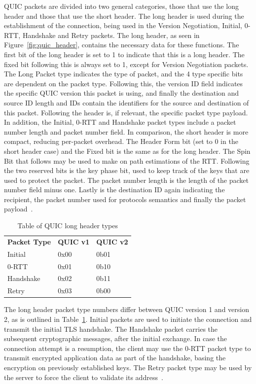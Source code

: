 \documentclass[english, 12pt, a4paper, elec, utf8, a-2b, online]{aaltothesis}
\begin{document}
QUIC packets are divided into two general categories, those that use the long header
and those that use the short header. The long header is used during the establishment
of the connection, being used in the Version Negotiation, Initial, 0-RTT, Handshake
and Retry packets. The long header, as seen in Figure~\ref{fig:quic_header}, contains the
necessary data for these functions. The first bit of the long header is set to 1 to indicate
that this is a long header. The fixed bit following this is always set to 1, except
for Version Negotiation packets. The Long Packet type indicates the type of packet,
and the 4 type specific bits are dependent on the packet type. Following this,
the version ID field indicates the specific QUIC version this packet is using, and
finally the destination and source ID length and IDs contain the identifiers for
the source and destination of this packet. Following the header is, if relevant,
the specific packet type payload. In addition, the Initial, 0-RTT and Handshake
packet types include a packet number length and packet number field. In comparison,
the short header is more compact, reducing per-packet overhead. The Header Form bit
(set to 0 in the short header case) and the Fixed bit is the same as for the long
header. The Spin Bit that follows may be used to make on path estimations of
the RTT. Following the two reserved bits is the key phase bit, used to keep
track of the keys that are used to protect the packet. The packet number length
is the length of the packet number field minus one. Lastly is the destination ID
again indicating the recipient, the packet number used for protocols semantics
and finally the packet payload~\cite{rfc9000}.

\begin{table}[tb]
	\centering
	\caption{Table of QUIC long header types}
	\label{tab:quic_long_header_types}
	\begin{tabular}{lll}
	\textbf{Packet Type}		  & \textbf{QUIC v1} & \textbf{QUIC v2} \\
	Initial   & 0x00    & 0b01    \\
	0-RTT     & 0x01    & 0b10    \\
	Handshake & 0x02    & 0b11    \\
	Retry     & 0x03    & 0b00   
	\end{tabular}
\end{table}
The long header packet type numbers differ between QUIC version 1 and version 2, as
is outlined in Table~\ref{tab:quic_long_header_types}. Initial packets are used to initiate the connection and transmit
the initial TLS handshake. The Handshake packet carries the subsequent
cryptographic messages, after the initial exchange. In case the connection attempt is
a resumption, the client may use the 0-RTT packet type to transmit encrypted application
data as part of the handshake, basing the encryption on previously established keys. The
Retry packet type may be used by the server to force the client to
validate its address~\cite{rfc9000}.
\end{document}
